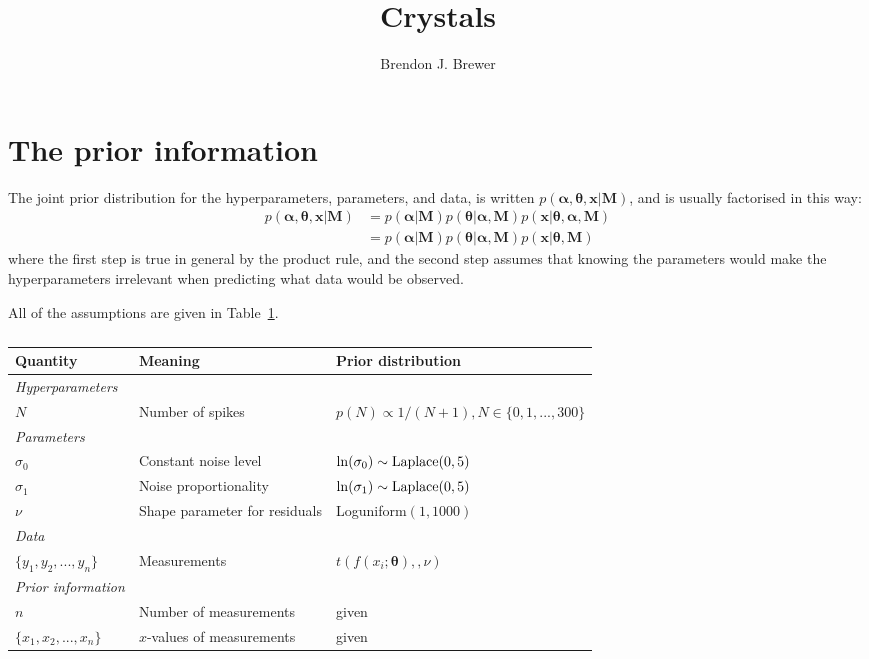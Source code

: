 \documentclass[a4paper, 12pt]{article}
\title{Crystals}
\author{Brendon J. Brewer}
\date{}
\newcommand{\hypers}{\boldsymbol{\alpha}}
\newcommand{\params}{\boldsymbol{\theta}}
\newcommand{\data}{\boldsymbol{x}}
\newcommand{\info}{\boldsymbol{M}}
\begin{document}
\maketitle


\setlength{\parindent}{0pt}
\setlength{\parskip}{8pt}

\section{The prior information}

The joint prior distribution for the hyperparameters, parameters, and data,
is written $p(\hypers, \params, \data | \info)$, and is usually factorised
in this way:
\begin{align}
p(\hypers, \params, \data | \info) &=
    p(\hypers | \info)p(\params | \hypers, \info)
    p(\data | \params, \hypers, \info)\\
    &= p(\hypers | \info)p(\params | \hypers, \info)
    p(\data | \params, \info)
\end{align}
where the first step is true in general by the product rule, and the second
step assumes that knowing the parameters would make the hyperparameters
irrelevant when predicting what data would be observed.

All of the assumptions are given in Table~\ref{tab:priors}.

\begin{table}
\centering
\begin{tabular}{|lll|}
\hline
{\bf Quantity}      &   {\bf Meaning}   &  {\bf Prior distribution}\\
\hline
{\em Hyperparameters} & &\\
$N$     &   Number of spikes    &  $p(N) \propto 1/(N+1), N \in \{0, 1, ..., 300\}$\\
\hline
{\em Parameters}& &\\
$\sigma_0$ &    Constant noise level  &   $\ln(\sigma_0) \sim \textnormal{Laplace}(0,5)$\\
$\sigma_1$ &    Noise proportionality   &  $\ln(\sigma_1) \sim \textnormal{Laplace}(0,5)$ \\
$\nu$     &   Shape parameter for residuals   &   Loguniform$(1, 1000)$\\
\hline
{\em Data}&&\\
\hline
$\{y_1, y_2, ..., y_n\}$  &   Measurements    & $t(f(x_i; \params), ,\nu)$\\
\hline
{\em Prior information}&&\\
\hline
$n$ & Number of measurements & given\\
$\{x_1, x_2, ..., x_n\}$  & $x$-values of measurements & given \\

\hline
\end{tabular}
\caption{\label{tab:priors}}
\end{table}
\end{document}
